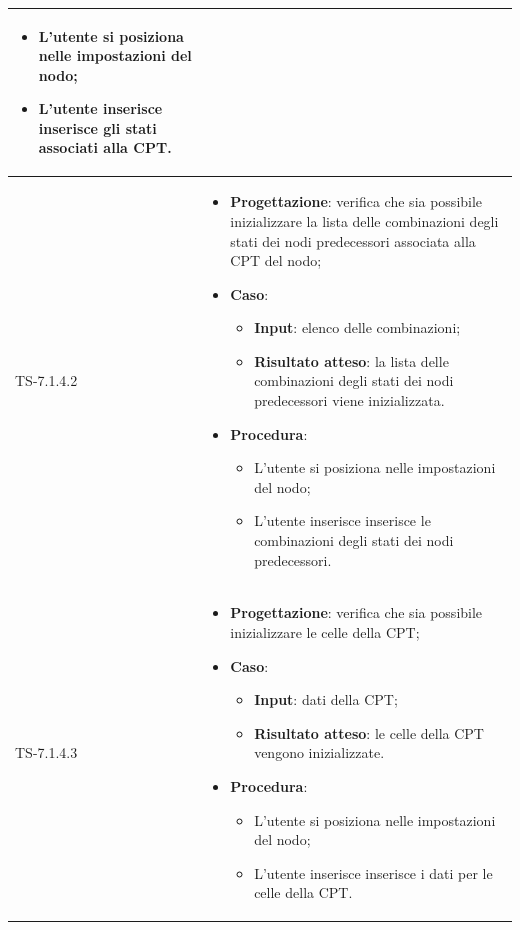 \begin{longtable}{|C{2.5cm}|C{13cm}|}
\begin{itemize}
\begin{itemize}
		\item L'utente si posiziona nelle impostazioni del nodo;
		\item L'utente inserisce inserisce gli stati associati alla CPT.
	\end{itemize} 
\end{itemize}
	  \\
	\hline
	{TS-7.1.4.2} &
\begin{itemize}
	\item \textbf{Progettazione}: verifica che sia possibile inizializzare la lista delle combinazioni degli stati dei nodi predecessori associata alla CPT del nodo;
	\item \textbf{Caso}: 
	\begin{itemize}
		\item \textbf{Input}: elenco delle combinazioni;
		\item \textbf{Risultato atteso}: la lista delle combinazioni degli stati dei nodi predecessori viene inizializzata.
	\end{itemize}
	\item \textbf{Procedura}:
	\begin{itemize}
		\item L'utente si posiziona nelle impostazioni del nodo;
		\item L'utente inserisce inserisce le combinazioni degli stati dei nodi predecessori.
	\end{itemize} 
\end{itemize}
	 \\
	\hline
	{TS-7.1.4.3} &
\begin{itemize}
	\item \textbf{Progettazione}:  verifica che sia possibile inizializzare le celle della CPT;
	\item \textbf{Caso}: 
	\begin{itemize}
		\item \textbf{Input}: dati della CPT;
		\item \textbf{Risultato atteso}: le celle della CPT vengono inizializzate.
	\end{itemize}
	\item \textbf{Procedura}:
	\begin{itemize}
		\item L'utente si posiziona nelle impostazioni del nodo;
		\item L'utente inserisce inserisce i dati per le celle della CPT.
	\end{itemize} 
\end{itemize}

\end{longtable}
